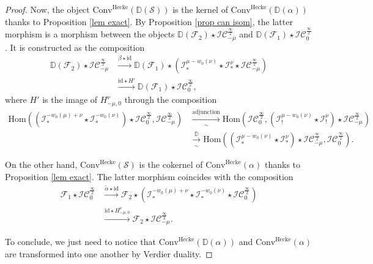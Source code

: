 \documentclass[11pt]{amsart}
\theoremstyle{plain}
\theoremstyle{remark}
\numberwithin{equation}{section}
\begin{document}
\begin{proof}
Now, the object $\mathrm{Conv}^{\mathrm{Hecke}}(\mathbb{D}(\mathcal{S}))$ is the kernel of $\mathrm{Conv}^{\mathrm{Hecke}}(\mathbb{D}(\alpha))$ thanks to Proposition \ref{lem exact}.
    By Proposition \ref{prop can isom}, the latter morphism is a morphism between the objects $\mathbb{D}(\mathcal{F}_2)\star\mathcal{IC}^{\frac{\infty}{2}}_{-\mu}$ and $\mathbb{D}(\mathcal{F}_1)\star\mathcal{IC}^\frac{\infty}{2}_0$. It is constructed as the composition
    \begin{align*}
        \mathbb{D}(\mathcal{F}_2)\star\mathcal{IC}^{\frac{\infty}{2}}_{-\mu}&\xrightarrow{\beta\star\mathrm{id}}\mathbb{D}(\mathcal{F}_1)\star(\mathcal{I}^{\mu-w_0(\nu)}_*\star\mathcal{I}^{\nu}_*\star\mathcal{IC}^{\frac{\infty}{2}}_{-\mu})\\
        &\xrightarrow{\mathrm{id}\star H'}\mathbb{D}(\mathcal{F}_1)\star\mathcal{IC}^\frac{\infty}{2}_0, 
    \end{align*}
    where $H'$ is the image of $H^\nu_{-\mu,0}$ through the composition
    \begin{align*}
        \mathrm{Hom}((\mathcal{I}^{-w_0(\mu)+\nu}_*\star\mathcal{I}^{-w_0(\nu)}_*)\star\mathcal{IC}^\frac{\infty}{2}_0,\mathcal{IC}^{\frac{\infty}{2}}_{-\mu})&\xrightarrow[\sim]{\text{adjunction}}\mathrm{Hom}(\mathcal{IC}^\frac{\infty}{2}_0,(\mathcal{I}^{\mu-w_0(\nu)}_!\star\mathcal{I}^{\nu}_!)\star\mathcal{IC}^{\frac{\infty}{2}}_{-\mu})\\
        &\xrightarrow[\sim]{\mathbb{D}}\mathrm{Hom}((\mathcal{I}^{\mu-w_0(\nu)}_*\star\mathcal{I}^{\nu}_*)\star\mathcal{IC}^{\frac{\infty}{2}}_{-\mu},\mathcal{IC}^\frac{\infty}{2}_0).
    \end{align*}

    On the other hand, $\mathrm{Conv}^{\mathrm{Hecke}}(\mathcal{S})$ is the cokernel of $\mathrm{Conv}^{\mathrm{Hecke}}(\alpha)$ thanks to Proposition \ref{lem exact}. The latter morphism coincides with the composition
    \begin{align*}
        \mathcal{F}_1\star\mathcal{IC}^\frac{\infty}{2}_0&\xrightarrow{\tilde{\alpha}\star\mathrm{id}}\mathcal{F}_2\star(\mathcal{I}^{-w_0(\mu)+\nu}_*\star\mathcal{I}^{-w_0(\nu)}_*\star\mathcal{IC}^\frac{\infty}{2}_0)\\
        &\xrightarrow{\mathrm{id}\star H_{-\mu,0}^{\nu}} \mathcal{F}_2\star\mathcal{IC}^{\frac{\infty}{2}}_{-\mu}. 
    \end{align*}

    To conclude, we just need to notice that $\mathrm{Conv}^{\mathrm{Hecke}}(\mathbb{D}(\alpha))$ and $\mathrm{Conv}^{\mathrm{Hecke}}(\alpha)$ are transformed into one another by Verdier duality.
\end{proof}	
\end{document}
